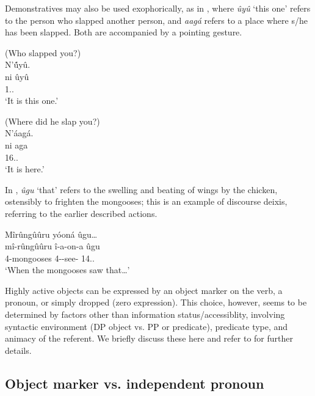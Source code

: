 \documentclass[output=paper]{langscibook}
\begin{document}
\z


Demonstratives may also be used exophorically, as in , where \textit{ûyû} ‘this one’ refers to the person who slapped another person, and \textit{aagá} refers to a place where s/he has been slapped. Both are accompanied by a pointing gesture.

\ea
\label{bkm:Ref116888125}
\ea
(Who slapped you?) \\
N’\'{û}yû.\\
\gll
ni  ûyû\\
\COP{}  1.\DEM.\PROX{}\\
\glt
‘It is this one.’


\ex
(Where did he slap you?)\\
N’áagá.\\
\gll
ni  aga\\
\COP{}  16.\DEM.\PROX{}\\
\glt
‘It is here.’

\z
\z

In , \textit{ûgu} ‘that’ refers to the swelling and beating of wings by the chicken, ostensibly to frighten the mongooses; this is an example of discourse deixis, referring to the earlier described actions.

\ea
\label{bkm:Ref120116261}
Mîrûngûûru yóoná ûgu…\\
\gll
mî-rûngûûru  î-a-on-a  ûgu\\
4-mongooses 4\SM-\PST{}-see-\FV{} \textsc{14.\DEM.\MED{}}\\
\glt
‘When the mongooses saw that…’

\z


Highly active objects can be expressed by an object marker on the verb, a pronoun, or simply dropped (zero expression). This choice, however, seems to be determined by factors other than information status\slash accessiblity, involving syntactic environment (DP object vs. PP or predicate), predicate type, and animacy of the referent. We briefly discuss these here and refer to \citet{Kanampiu2023} for further details.

\subsection{Object marker vs. independent pronoun}
\end{document}

